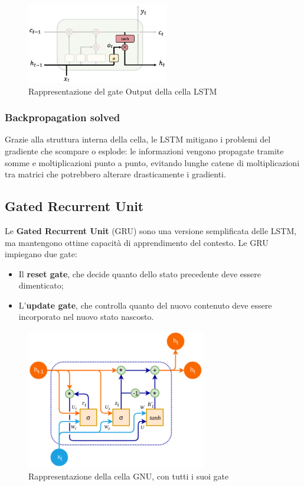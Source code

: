 \begin{figure}[!ht]
    \centering
    \includegraphics[width=0.55\textwidth]{figure/OutputLSTM.png}
    \caption{Rappresentazione del gate Output della cella LSTM}
    \label{fig:LSTMOutput}
\end{figure}

\subsubsection{Backpropagation solved}
Grazie alla struttura interna della cella, le LSTM mitigano i problemi del gradiente che scompare o esplode: le informazioni vengono propagate tramite somme e moltiplicazioni punto a punto, evitando lunghe catene di moltiplicazioni tra matrici che potrebbero alterare drasticamente i gradienti.

\subsection{Gated Recurrent Unit}
Le \textbf{Gated Recurrent Unit} (GRU) sono una versione semplificata delle LSTM, ma mantengono ottime capacità di apprendimento del contesto. Le GRU impiegano due gate:
\begin{itemize}
    \item Il \textbf{reset gate}, che decide quanto dello stato precedente deve essere dimenticato;
    \item L’\textbf{update gate}, che controlla quanto del nuovo contenuto deve essere incorporato nel nuovo stato nascosto.
\end{itemize}

\begin{figure}[hbtp]
    \centering
    \includegraphics[width=0.70\textwidth]{figure/GNU.png}
    \caption{Rappresentazione della cella GNU, con tutti i suoi gate}
    \label{fig:GNU}
\end{figure}

